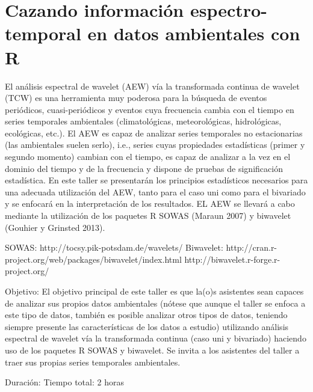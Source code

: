 \chapter{Cazando información espectro-temporal en datos ambientales con R}




El análisis espectral de wavelet (AEW) vía la transformada continua de wavelet (TCW) es una herramienta muy poderosa para la búsqueda  de eventos periódicos, cuasi-periódicos y eventos cuya frecuencia cambia con el tiempo en series temporales ambientales (climatológicas,  meteorológicas, hidrológicas, ecológicas, etc.). El AEW es capaz de analizar series temporales no estacionarias (las ambientales suelen serlo), i.e., series cuyas propiedades estadísticas (primer y segundo momento) cambian con el tiempo, es capaz de analizar a la vez en el dominio del tiempo y de la frecuencia y dispone de pruebas de significación estadística. En este taller se presentarán los principios estadísticos necesarios para una adecuada utilización del AEW, tanto para el caso uni como para el bivariado y se enfocará en la interpretación de los resultados. EL AEW se llevará a cabo mediante la utilización de los paquetes R SOWAS (Maraun 2007) y biwavelet (Gouhier y Grinsted 2013). 

SOWAS: http://tocsy.pik-potsdam.de/wavelets/
Biwavelet: http://cran.r-project.org/web/packages/biwavelet/index.html
http://biwavelet.r-forge.r-project.org/


Objetivo: 
El objetivo principal de este taller es que la(o)s asistentes sean capaces de analizar sus propios datos ambientales (nótese que aunque  el taller se enfoca a este tipo de datos, también es posible analizar  otros tipos de datos, teniendo siempre presente las características de  los datos a estudio) utilizando análisis espectral de wavelet vía la  transformada continua (caso uni y bivariado) haciendo uso de los paquetes R SOWAS y biwavelet. Se invita a los asistentes del taller a traer sus propias series temporales ambientales. 


Duración: 
Tiempo total: 2 horas 

